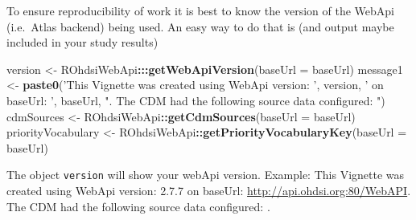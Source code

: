 \documentclass[
]{article}
\newenvironment{Shaded}{\begin{snugshade}}{\end{snugshade}}
\newcommand{\CommentTok}[1]{\textcolor[rgb]{0.56,0.35,0.01}{\textit{#1}}}
\newcommand{\DataTypeTok}[1]{\textcolor[rgb]{0.13,0.29,0.53}{#1}}
\newcommand{\KeywordTok}[1]{\textcolor[rgb]{0.13,0.29,0.53}{\textbf{#1}}}
\newcommand{\NormalTok}[1]{#1}
\newcommand{\OperatorTok}[1]{\textcolor[rgb]{0.81,0.36,0.00}{\textbf{#1}}}
\newcommand{\StringTok}[1]{\textcolor[rgb]{0.31,0.60,0.02}{#1}}
\begin{document}
To ensure reproducibility of work it is best to know the version of the
WebApi (i.e.~Atlas backend) being used. An easy way to do that is (and
output maybe included in your study results)

\begin{Shaded}
\begin{Highlighting}[]

\NormalTok{version <-}\StringTok{ }\NormalTok{ROhdsiWebApi}\OperatorTok{:::}\KeywordTok{getWebApiVersion}\NormalTok{(}\DataTypeTok{baseUrl =}\NormalTok{ baseUrl)}
\NormalTok{message1 <-}\StringTok{ }\KeywordTok{paste0}\NormalTok{(}\StringTok{'This Vignette was created using WebApi version: '}\NormalTok{, }
\NormalTok{                   version, }
                   \StringTok{' on baseUrl: '}\NormalTok{, }
\NormalTok{                   baseUrl, }
                   \StringTok{". The CDM had the following source data configured: "}\NormalTok{)}
\NormalTok{cdmSources <-}\StringTok{ }\NormalTok{ROhdsiWebApi}\OperatorTok{::}\KeywordTok{getCdmSources}\NormalTok{(}\DataTypeTok{baseUrl =}\NormalTok{ baseUrl)}
\NormalTok{priorityVocabulary <-}\StringTok{ }\NormalTok{ROhdsiWebApi}\OperatorTok{::}\KeywordTok{getPriorityVocabularyKey}\NormalTok{(}\DataTypeTok{baseUrl =}\NormalTok{ baseUrl)}
\end{Highlighting}
\end{Shaded}

The object \texttt{version} will show your webApi version. Example: This
Vignette was created using WebApi version: 2.7.7 on baseUrl:
\url{http://api.ohdsi.org:80/WebAPI}. The CDM had the following source
data configured: .

\begin{Shaded}
\end{Shaded}
\end{document}
